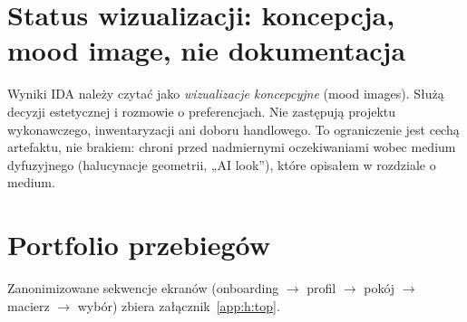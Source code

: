 \section{Status wizualizacji: koncepcja, mood image, nie dokumentacja}
\label{ch07:sec:status-wizualizacji}

Wyniki IDA należy czytać jako \emph{wizualizacje koncepcyjne} (mood images). Służą decyzji estetycznej i rozmowie o preferencjach. Nie zastępują projektu wykonawczego, inwentaryzacji ani doboru handlowego. To ograniczenie jest cechą artefaktu, nie brakiem: chroni przed nadmiernymi oczekiwaniami wobec medium dyfuzyjnego (halucynacje geometrii, „AI look”), które opisałem w rozdziale o medium.

\section{Portfolio przebiegów}
\label{ch07:sec:portfolio}

Zanonimizowane sekwencje ekranów (onboarding $\rightarrow$ profil $\rightarrow$ pokój $\rightarrow$ macierz $\rightarrow$ wybór) zbiera załącznik~\ref{app:h:top}.
